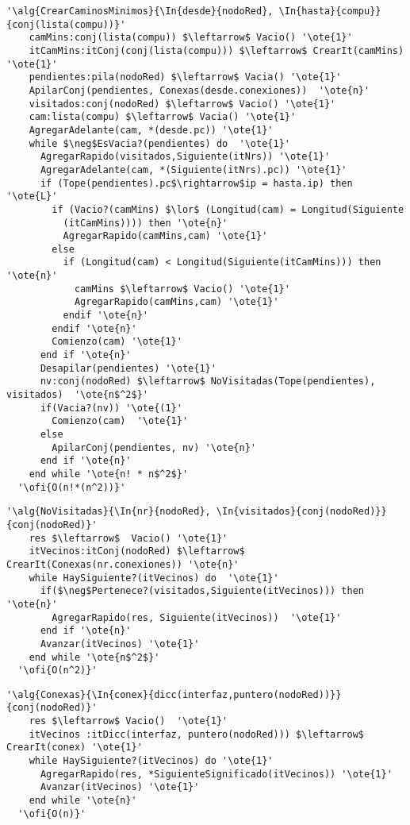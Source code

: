 \begin{lstlisting}[mathescape]
  '\alg{CrearCaminosMinimos}{\In{desde}{nodoRed}, \In{hasta}{compu}}{conj(lista(compu))}'
    camMins:conj(lista(compu)) $\leftarrow$ Vacio() '\ote{1}'
    itCamMins:itConj(conj(lista(compu))) $\leftarrow$ CrearIt(camMins) '\ote{1}'
    pendientes:pila(nodoRed) $\leftarrow$ Vacia() '\ote{1}'
    ApilarConj(pendientes, Conexas(desde.conexiones))  '\ote{n}'
    visitados:conj(nodoRed) $\leftarrow$ Vacio() '\ote{1}'
    cam:lista(compu) $\leftarrow$ Vacia() '\ote{1}'
    AgregarAdelante(cam, *(desde.pc)) '\ote{1}'
    while $\neg$EsVacia?(pendientes) do  '\ote{1}'
      AgregarRapido(visitados,Siguiente(itNrs)) '\ote{1}'
      AgregarAdelante(cam, *(Siguiente(itNrs).pc)) '\ote{1}'
      if (Tope(pendientes).pc$\rightarrow$ip = hasta.ip) then '\ote{L}'
        if (Vacio?(camMins) $\lor$ (Longitud(cam) = Longitud(Siguiente
          (itCamMins)))) then '\ote{n}'
          AgregarRapido(camMins,cam) '\ote{1}'
        else
          if (Longitud(cam) < Longitud(Siguiente(itCamMins))) then '\ote{n}'
            camMins $\leftarrow$ Vacio() '\ote{1}'
            AgregarRapido(camMins,cam) '\ote{1}'
          endif '\ote{n}'
        endif '\ote{n}'
        Comienzo(cam) '\ote{1}'
      end if '\ote{n}'
      Desapilar(pendientes) '\ote{1}'
      nv:conj(nodoRed) $\leftarrow$ NoVisitadas(Tope(pendientes), visitados)  '\ote{n$^2$}'
      if(Vacia?(nv)) '\ote{(1}'
        Comienzo(cam)  '\ote{1}'
      else
        ApilarConj(pendientes, nv) '\ote{n}'
      end if '\ote{n}'
    end while '\ote{n! * n$^2$}'
  '\ofi{O(n!*(n^2))}'
\end{lstlisting}


\begin{lstlisting}[mathescape]
  '\alg{NoVisitadas}{\In{nr}{nodoRed}, \In{visitados}{conj(nodoRed)}}{conj(nodoRed)}'
    res $\leftarrow$  Vacio() '\ote{1}'
    itVecinos:itConj(nodoRed) $\leftarrow$ CrearIt(Conexas(nr.conexiones)) '\ote{n}'
    while HaySiguiente?(itVecinos) do  '\ote{1}'                                                   
      if($\neg$Pertenece?(visitados,Siguiente(itVecinos))) then '\ote{n}'
        AgregarRapido(res, Siguiente(itVecinos))  '\ote{1}'
      end if '\ote{n}'
      Avanzar(itVecinos) '\ote{1}'
    end while '\ote{n$^2$}'
  '\ofi{O(n^2)}'
\end{lstlisting}

\begin{lstlisting}[mathescape]
  '\alg{Conexas}{\In{conex}{dicc(interfaz,puntero(nodoRed))}}{conj(nodoRed)}'
    res $\leftarrow$ Vacio()  '\ote{1}'
    itVecinos :itDicc(interfaz, puntero(nodoRed))) $\leftarrow$ CrearIt(conex) '\ote{1}'
    while HaySiguiente?(itVecinos) do '\ote{1}'                                                    
      AgregarRapido(res, *SiguienteSignificado(itVecinos)) '\ote{1}'
      Avanzar(itVecinos) '\ote{1}'
    end while '\ote{n}'
  '\ofi{O(n)}'
\end{lstlisting}


